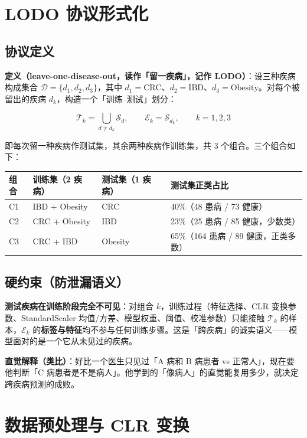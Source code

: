 \documentclass{internal-report}
\begin{document}
\section{LODO 协议形式化}

\subsection{协议定义}

\textbf{定义（leave-one-disease-out，读作「留一疾病」，记作 LODO）}：设三种疾病构成集合 $\mathcal{D}=\{d_1,d_2,d_3\}$，其中 $d_1=\text{CRC}$、$d_2=\text{IBD}$、$d_3=\text{Obesity}$。对每个被留出的疾病 $d_k$，构造一个「训练--测试」划分：

$$
\mathcal{T}_k = \bigcup_{d\neq d_k} \mathcal{S}_d, \qquad \mathcal{E}_k = \mathcal{S}_{d_k}, \qquad k=1,2,3
$$

即每次留一种疾病作测试集，其余两种疾病作训练集，共 3 个组合。三个组合如下：

\begin{center}
\begin{tabular}{llll}
\toprule
组合 & 训练集（2 疾病） & 测试集（1 疾病） & 测试集正类占比 \\
\midrule
C1 & IBD + Obesity & CRC & 40\%（48 患病 / 73 健康） \\
C2 & CRC + Obesity & IBD & 23\%（25 患病 / 85 健康，少数类） \\
C3 & CRC + IBD & Obesity & 65\%（164 患病 / 89 健康，正类多数） \\
\bottomrule
\end{tabular}
\end{center}

\subsection{硬约束（防泄漏语义）}

\textbf{测试疾病在训练阶段完全不可见}：对组合 $k$，训练过程（特征选择、CLR 变换参数、StandardScaler 均值/方差、模型权重、阈值、校准参数）只能接触 $\mathcal{T}_k$ 的样本，$\mathcal{E}_k$ 的\textbf{标签与特征}均不参与任何训练步骤。这是「跨疾病」的诚实语义——模型面对的是一个它从未见过的疾病。

\textbf{直觉解释（类比）}：好比一个医生只见过「A 病和 B 病患者 vs 正常人」，现在要他判断「C 病患者是不是病人」。他学到的「像病人」的直觉能复用多少，就决定跨疾病预测的成败。

\section{数据预处理与 CLR 变换}
\end{document}
